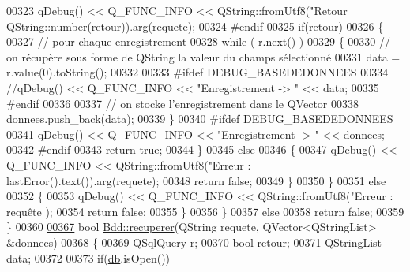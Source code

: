 \begin{DoxyCode}
{{{{{{{{{{00323             qDebug() << Q\_FUNC\_INFO << QString::fromUtf8(\textcolor{stringliteral}{"Retour %
      QString::number(retour)).arg(requete);
00324 \textcolor{preprocessor}{            #endif}
00325             \textcolor{keywordflow}{if}(retour)
00326             \{
00327                 \textcolor{comment}{// pour chaque enregistrement}
00328                 \textcolor{keywordflow}{while} ( r.next() )
00329                 \{
00330                     \textcolor{comment}{// on récupère sous forme de QString la valeur du champs sélectionné}
00331                     data = r.value(0).toString();
00332 
00333 \textcolor{preprocessor}{                    #ifdef DEBUG\_BASEDEDONNEES}
00334                     \textcolor{comment}{//qDebug() << Q\_FUNC\_INFO << "Enregistrement -> " << data;}
00335 \textcolor{preprocessor}{                    #endif}
00336 
00337                     \textcolor{comment}{// on stocke l'enregistrement dans le QVector}
00338                     donnees.push\_back(data);
00339                 \}
00340 \textcolor{preprocessor}{                #ifdef DEBUG\_BASEDEDONNEES}
00341                 qDebug() << Q\_FUNC\_INFO << \textcolor{stringliteral}{"Enregistrement -> "} << donnees;
00342 \textcolor{preprocessor}{                #endif}
00343                 \textcolor{keywordflow}{return} \textcolor{keyword}{true};
00344             \}
00345             \textcolor{keywordflow}{else}
00346             \{
00347                 qDebug() << Q\_FUNC\_INFO << QString::fromUtf8(\textcolor{stringliteral}{"Erreur : %
      lastError().text()).arg(requete);
00348                 \textcolor{keywordflow}{return} \textcolor{keyword}{false};
00349             \}
00350         \}
00351         \textcolor{keywordflow}{else}
00352         \{
00353             qDebug() << Q\_FUNC\_INFO << QString::fromUtf8(\textcolor{stringliteral}{"Erreur : requête %
      );
00354             \textcolor{keywordflow}{return} \textcolor{keyword}{false};
00355         \}
00356     \}
00357     \textcolor{keywordflow}{else}
00358         \textcolor{keywordflow}{return} \textcolor{keyword}{false};
00359 \}
00360 
\hyperlink{class_bdd_a482cd502a23b933712400044e1ba3e37}{00367} \textcolor{keywordtype}{bool} \hyperlink{class_bdd_a8f25d29d309041bbf875700db0efd97b}{Bdd::recuperer}(QString requete, QVector<QStringList> &donnees)
00368 \{
00369     QSqlQuery r;
00370     \textcolor{keywordtype}{bool} retour;
00371     QStringList data;
00372 
00373     \textcolor{keywordflow}{if}(\hyperlink{class_bdd_a8628c1686deda86999f86689c3e7268e}{db}.isOpen())
}}}}}}}}}}}}}
\end{DoxyCode}
